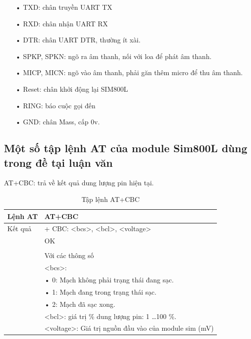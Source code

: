 \begin{itemize}
\item[•]TXD: chân truyền UART TX
\item[•]RXD: chân nhận UART RX
\item[•]DTR: chân UART DTR, thường ít xài.
\item[•]SPKP, SPKN: ngõ ra âm thanh, nối với loa để phát âm thanh.
\item[•]MICP, MICN: ngõ vào âm thanh, phải găn thêm micro để thu âm thanh.
\item[•]Reset: chân khởi động lại SIM800L
\item[•]RING: báo cuộc gọi đến
\item[•]GND: chân Mass, cấp 0v.
\end{itemize}

\newpage
\subsection*{Một số tập lệnh AT của module Sim800L dùng trong đề tại luận văn}


 AT+CBC: trả về kết quả dung lượng pin hiện tại.
\begin{table}[htp]
\label{table:at+cbc}
\begin{tabular}{|l|l|}
\hline
Lệnh AT & AT+CBC \\ \hline
Kết quả  & 
+ CBC: <bcs>, <bcl>, <voltage> \\
&OK \\
& \\
& Với các thông số \\
& \hspace{0.5cm} <bcs>: \\
& \hspace{2cm} • 0: Mạch không phải trạng thái đang sạc. \\
& \hspace{2cm} • 1: Mạch đang trong trạng thái sạc. \\
& \hspace{2cm} • 2: Mạch đã sạc xong. \\
& \hspace{0.5cm} <bcl>: giá trị \% dung lượng pin: 1 …100 \%. \\
& \hspace{0.5cm} <voltage>: Giá trị nguồn đầu vào của module sim (mV) \\\hline
\end{tabular}
\caption[Tập lệnh AT+CBC: kết quả dung lượng pin hiện tại]{Tập lệnh AT+CBC}
\end{table}



